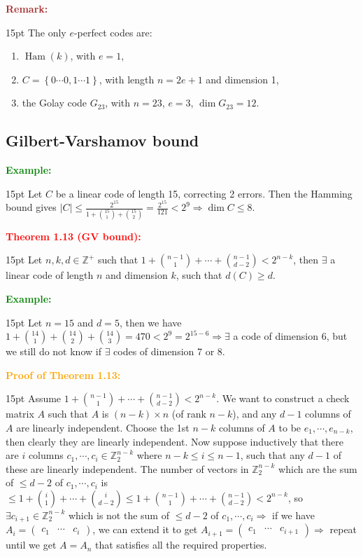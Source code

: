 \documentclass[12pt]{article}
\newcommand{\noparskip}{\vspace{-\parskip}}
\newenvironment{points}
	{\begin{enumerate}[label = (\arabic*)]}
	{\end{enumerate}}
\newenvironment{dent}
	{\begin{adjustwidth}{15pt}{}\noparskip}
	{\end{adjustwidth}}
\newenvironment{result}[1]
	{\textcolor{Red}{\textbf{#1:}}\begin{dent}}
	{\end{dent}}
\newenvironment{proof}[1]
	{\textcolor{Orange}{\textbf{Proof of #1:}}\begin{dent}}
	{\end{dent}}
\newenvironment{example}
	{\textcolor{Green}{\textbf{Example:}}\begin{dent}}
	{\end{dent}}
\newenvironment{remark}
	{\textcolor{Brown}{\textbf{Remark:}}\begin{dent}}
	{\end{dent}}
\renewcommand{\implies}{\Rightarrow}
\newcommand{\set}[1]{\left\{ #1 \right\}}
\newcommand{\sizeof}[1]{\left| #1 \right|}
\newcommand{\Z}{\mathbb{Z}}
\newcommand{\Ham}[1]{\operatorname{Ham}(#1)}
\begin{document}
\begin{remark}
The only $e$-perfect codes are:
\noparskip
\begin{points}
\item $\Ham{k}$, with $e = 1$,
\item $C = \set{0 \cdots 0, 1 \cdots 1}$, with length $n = 2e + 1$ and dimension 1,
\item the Golay code $G_{23}$, with $n = 23$, $e = 3$, $\dim G_{23} = 12$.
\end{points}
\end{remark}

\subsection{Gilbert-Varshamov bound}

\begin{example}
Let $C$ be a linear code of length 15, correcting 2 errors. Then the Hamming bound gives $\sizeof{C} \le \frac{2^{15}}{1 + \binom{15}{1} + \binom{15}{2}} = \frac{2^{15}}{121} < 2^9 \implies \dim C \le 8$.
\end{example}

\begin{result}{Theorem 1.13 (GV bound)}
Let $n, k, d \in \Z^+$ such that $1 + \binom{n - 1}{1} + \cdots + \binom{n - 1}{d - 2} < 2^{n - k}$, then $\exists$ a linear code of length $n$ and dimension $k$, such that $d(C) \ge d$.
\end{result}

\begin{example}
Let $n = 15$ and $d = 5$, then we have $1 + \binom{14}{1} + \binom{14}{2} + \binom{14}{3} = 470 < 2^9 = 2^{15 - 6} \implies \exists$ a code of dimension 6, but we still do not know if $\exists$ codes of dimension 7 or 8.
\end{example}

\begin{proof}{Theorem 1.13}
Assume $1 + \binom{n - 1}{1} + \cdots + \binom{n - 1}{d - 2} < 2^{n - k}$. We want to construct a check matrix $A$ such that $A$ is $(n - k) \times n$ (of rank $n - k$), and any $d - 1$ columns of $A$ are linearly independent. Choose the 1st $n-k$ columns of $A$ to be $e_1, \cdots, e_{n - k}$, then clearly they are linearly independent. Now suppose inductively that there are $i$ columns $c_1, \cdots, c_i \in \Z_2^{n - k}$ where $n - k \le i \le n - 1$, such that any $d - 1$ of these are linearly independent. The number of vectors in $\Z_2^{n - k}$ which are the sum of $\le d - 2$ of $c_1, \cdots, c_i$ is $\le 1 + \binom{i}{1} + \cdots + \binom{i}{d - 2} \le 1 + \binom{n - 1}{1} + \cdots + \binom{n - 1}{d - 2} < 2^{n - k}$, so $\exists c_{i + 1} \in \Z_2^{n - k}$ which is not the sum of $\le d - 2$ of $c_1, \cdots, c_i \implies$ if we have $A_i = \begin{pmatrix} c_1 & \cdots & c_i \end{pmatrix}$, we can extend it to get $A_{i + 1} = \begin{pmatrix} c_1 & \cdots & c_{i + 1} \end{pmatrix} \implies$ repeat until we get $A = A_n$ that satisfies all the required properties.
\end{proof}
\end{document}
